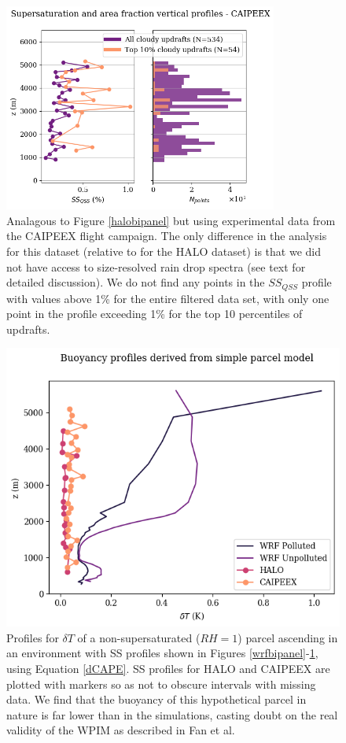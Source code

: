 \documentclass{article}
\begin{document}
\begin{figure}[ht]
    \centering
    \includegraphics[width=9cm]{revcaipeex/v8_FINAL_combined_bipanel_ss_qss_vs_z_figure.png}
    \caption{Analagous to Figure \ref{halobipanel} but using experimental data from the CAIPEEX flight campaign. The only difference in the analysis for this dataset (relative to for the HALO dataset) is that we did not have access to size-resolved rain drop spectra (see text for detailed discussion). We do not find any points in the $SS_{QSS}$ profile with values above 1\% for the entire filtered data set, with only one point in the profile exceeding 1\% for the top 10 percentiles of updrafts.}
    \label{caipeexbipanel}
\end{figure}

\begin{figure}[ht]
    \centering
    \includegraphics[width=12cm]{revmywrf/v2_FINAL_combined_dT_profile_figure.png}
    \caption{Profiles for $\delta T$ of a non-supersaturated ($RH=1$) parcel ascending in an environment with SS profiles shown in Figures \ref{wrfbipanel}-\ref{caipeexbipanel}, using Equation \ref{dCAPE}. SS profiles for HALO and CAIPEEX are plotted with markers so as not to obscure intervals with missing data. We find that the buoyancy of this hypothetical parcel in nature is far lower than in the simulations, casting doubt on the real validity of the WPIM as described in Fan et al.}
    \label{dTprofiles}
\end{figure}
\end{document}

